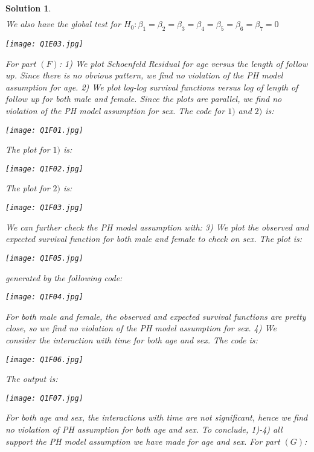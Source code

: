\documentclass[11pt]{article}
\newtheorem{sol}{Solution}
\begin{document}
\begin{sol}
\begin{align*}
	\end{align*}
	We also have the global test for $H_0: \beta_1 = \beta_2 = \beta_3 = \beta_4= \beta_5 = \beta_6 = \beta_7 = 0$
	\begin{center}
		\texttt{[image: Q1E03.jpg]}
	\end{center}
	For part $(F)$:\vskip 2mm
	1) We plot Schoenfeld Residual for age versus the length of follow up. Since there is no obvious pattern, we find no violation of the PH model assumption for age.\vskip 2mm
	2) We plot log-log survival functions versus log of length of follow up for both male and female. Since the plots are parallel, we find no violation of the PH model assumption for sex.\vskip 2mm
	The code for $1)$ and $2)$ is:
	\begin{center}
		\texttt{[image: Q1F01.jpg]}
	\end{center}
	The plot for $1)$ is:
	\begin{center}
		\texttt{[image: Q1F02.jpg]}
	\end{center}
	The plot for $2)$ is:
	\begin{center}
		\texttt{[image: Q1F03.jpg]}
	\end{center}
	We can further check the PH model assumption with:\vskip 2mm
	3) We plot the observed and expected survival function for both male and female to check on sex. \vskip 2mm
	The plot is:
	\begin{center}
		\texttt{[image: Q1F05.jpg]}
	\end{center}
	generated by the following code:
	\begin{center}
		\texttt{[image: Q1F04.jpg]}
	\end{center}
	For both male and female, the observed and expected survival functions are pretty close, so we find no violation of the PH model assumption for sex.\vskip 2mm
	4) We consider the interaction with time for both age and sex. The code is:
	\begin{center}
		\texttt{[image: Q1F06.jpg]}
	\end{center}
	The output is:
	\begin{center}
		\texttt{[image: Q1F07.jpg]}
	\end{center}
	For both age and sex, the interactions with time are not significant, hence we find no violation of PH assumption for both age and sex.\vskip 2mm
	To conclude, 1)-4) all support the PH model assumption we have made for age and sex.\vskip 2mm
	For part $(G)$:\vskip 2mm

\end{sol}
\end{document}
